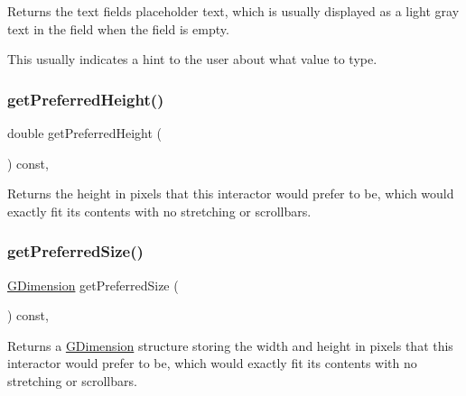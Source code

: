 Returns the text field\textquotesingle{}s placeholder text, which is usually displayed as a light gray text in the field when the field is empty. 

This usually indicates a hint to the user about what value to type. \mbox{\label{classGInteractor_a747de0961653847bdc6615dbf756d715}} 
\subsubsection{\texorpdfstring{get\+Preferred\+Height()}{getPreferredHeight()}}
{\footnotesize\ttfamily double get\+Preferred\+Height (\begin{DoxyParamCaption}{ }\end{DoxyParamCaption}) const\hspace{0.3cm}{\ttfamily [virtual]}, {\ttfamily [inherited]}}



Returns the height in pixels that this interactor would prefer to be, which would exactly fit its contents with no stretching or scrollbars. 

\mbox{\label{classGInteractor_a4aabbee761d8e9116275401131b7ccd1}} 
\subsubsection{\texorpdfstring{get\+Preferred\+Size()}{getPreferredSize()}}
{\footnotesize\ttfamily \mbox{\hyperlink{classGDimension}{G\+Dimension}} get\+Preferred\+Size (\begin{DoxyParamCaption}{ }\end{DoxyParamCaption}) const\hspace{0.3cm}{\ttfamily [virtual]}, {\ttfamily [inherited]}}



Returns a \mbox{\hyperlink{classGDimension}{G\+Dimension}} structure storing the width and height in pixels that this interactor would prefer to be, which would exactly fit its contents with no stretching or scrollbars. 



